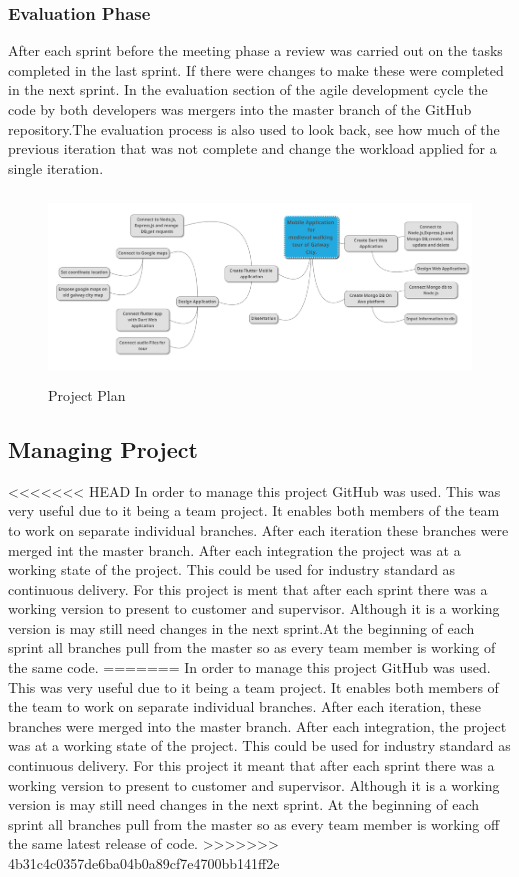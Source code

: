 \subsubsection{Evaluation Phase}
After each sprint before the meeting phase a review was carried out on the tasks completed in the last sprint. If there were changes to make these were completed in the next sprint. In the evaluation section of the agile development cycle the code by both developers was mergers into the master branch of the GitHub repository.The evaluation process is also used to look back, see how much of the previous iteration that was not complete and change the workload applied for a single iteration.\cite{agile_process}


\begin{figure}[ht]
    \centering
 \includegraphics[width=135mm, height=50mm,scale=0.5]{img/plan.png}
\caption{Project Plan}
\label{fig:Project Plan}
\end{figure}

\subsection{Managing Project}
<<<<<<< HEAD
In order to manage this project GitHub was used. This was very useful due to it being a team project. It enables both members of the team to work on separate individual branches. After each iteration these branches were merged int the master branch. After each integration the project was at a working state of the project. This could be used for industry standard as continuous delivery. For this project is ment that after each sprint there was a working version to present to customer and supervisor. Although it is a working version is may still need changes in the next sprint.At the beginning of each sprint all branches pull from the master so as every team member is working of the same code.
=======
In order to manage this project GitHub was used. This was very useful due to it being a team project. It enables both members of the team to work on separate individual branches. After each iteration, these branches were merged into the master branch. After each integration, the project was at a working state of the project. This could be used for industry standard as continuous delivery. For this project it meant that after each sprint there was a working version to present to customer and supervisor. Although it is a working version is may still need changes in the next sprint. At the beginning of each sprint all branches pull from the master so as every team member is working off the same latest release of code.
>>>>>>> 4b31c4c0357de6ba04b0a89cf7e4700bb141ff2e
